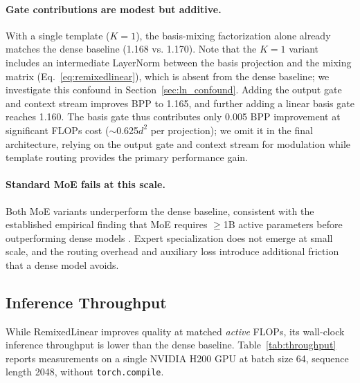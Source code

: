 \documentclass{article}
\begin{document}
\paragraph{Gate contributions are modest but additive.} With a single template ($K{=}1$), the basis-mixing factorization alone already matches the dense baseline (1.168 vs. 1.170). Note that the $K{=}1$ variant includes an intermediate LayerNorm between the basis projection and the mixing matrix (Eq.~\ref{eq:remixedlinear}), which is absent from the dense baseline; we investigate this confound in Section~\ref{sec:ln_confound}. Adding the output gate and context stream improves BPP to 1.165, and further adding a linear basis gate reaches 1.160. The basis gate thus contributes only 0.005 BPP improvement at significant FLOPs cost ($\sim$0.625$d^2$ per projection); we omit it in the final architecture, relying on the output gate and context stream for modulation while template routing provides the primary performance gain.

\paragraph{Standard MoE fails at this scale.} Both MoE variants underperform the dense baseline, consistent with the established empirical finding that MoE requires ${\geq}$1B active parameters before outperforming dense models \citep{fedus2022switch}. Expert specialization does not emerge at small scale, and the routing overhead and auxiliary loss introduce additional friction that a dense model avoids.

\subsection{Inference Throughput}
\label{sec:throughput}

While RemixedLinear improves quality at matched \emph{active} FLOPs, its wall-clock inference throughput is lower than the dense baseline. Table~\ref{tab:throughput} reports measurements on a single NVIDIA H200 GPU at batch size 64, sequence length 2048, without \texttt{torch.compile}.
\end{document}
